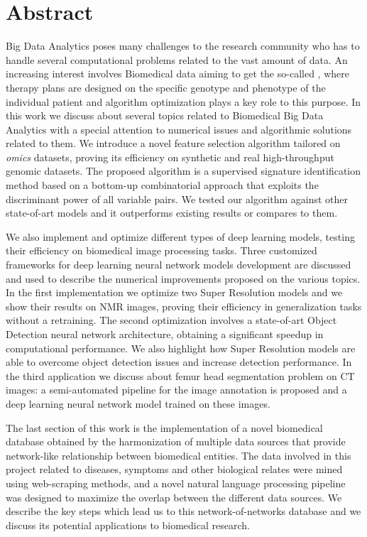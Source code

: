 \documentclass{standalone}
\begin{document}
\chapter*{Abstract}

Big Data Analytics poses many challenges to the research community who has to handle several computational problems related to the vast amount of data.
An increasing interest involves Biomedical data aiming to get the so-called , where therapy plans are designed on the specific genotype and phenotype of the individual patient and algorithm optimization plays a key role to this purpose.
In this work we discuss about several topics related to Biomedical Big Data Analytics with a special attention to numerical issues and algorithmic solutions related to them.
We introduce a novel feature selection algorithm tailored on \emph{omics} datasets, proving its efficiency on synthetic and real high-throughput genomic datasets.
The proposed algorithm is a supervised signature identification method based on a bottom-up combinatorial approach that exploits the discriminant power of all variable pairs.
We tested our algorithm against other state-of-art models and it outperforms existing results or compares to them.

We also implement and optimize different types of deep learning models, testing their efficiency on biomedical image processing tasks.
Three customized frameworks for deep learning neural network models development are discussed and used to describe the numerical improvements proposed on the various topics.
In the first implementation we optimize two Super Resolution models and we show their results on NMR images, proving their efficiency in generalization tasks without a retraining.
The second optimization involves a state-of-art Object Detection neural network architecture, obtaining a significant speedup in computational performance.
We also highlight how Super Resolution models are able to overcome object detection issues and increase detection performance.
In the third application we discuss about femur head segmentation problem on CT images: a semi-automated pipeline for the image annotation is proposed and a deep learning neural network model trained on these images.

The last section of this work is the implementation of a novel biomedical database obtained by the harmonization of multiple data sources that provide network-like relationship between biomedical entities.
The data involved in this project related to diseases, symptoms and other biological relates were mined using web-scraping methods, and a novel natural language processing pipeline was designed to maximize the overlap between the different data sources.
We describe the key steps which lead us to this network-of-networks database and we discuss its potential applications to biomedical research.
\end{document}
